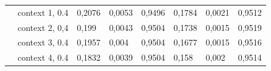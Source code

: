 \documentclass{siamart171218}
\begin{document}
\begin{appendices}
\begin{table}[H]
{\begin{tabular}{|c|l|lll|lll|}
 & context 1, 0.4 & \multicolumn{1}{l|}{0,2076} & \multicolumn{1}{l|}{0,0053} & 0,9496 & \multicolumn{1}{l|}{0,1784} & \multicolumn{1}{l|}{0,0021} & 0,9512 \\ \cline{2-8} 
 & context 2, 0,4 & \multicolumn{1}{l|}{0,199} & \multicolumn{1}{l|}{0,0043} & 0,9504 & \multicolumn{1}{l|}{0,1738} & \multicolumn{1}{l|}{0,0015} & 0,9519 \\ \cline{2-8} 
 & context 3, 0.4 & \multicolumn{1}{l|}{0,1957} & \multicolumn{1}{l|}{0,004} & 0,9504 & \multicolumn{1}{l|}{0,1677} & \multicolumn{1}{l|}{0,0015} & 0,9516 \\ \cline{2-8} 
 & context 4, 0.4 & \multicolumn{1}{l|}{0,1832} & \multicolumn{1}{l|}{0,0039} & 0,9504 & \multicolumn{1}{l|}{0,158} & \multicolumn{1}{l|}{0,002} & 0,9514 \\ \hline
\end{tabular}%
}

\label{table:1}
\end{table}


\end{appendices}
\end{document}
